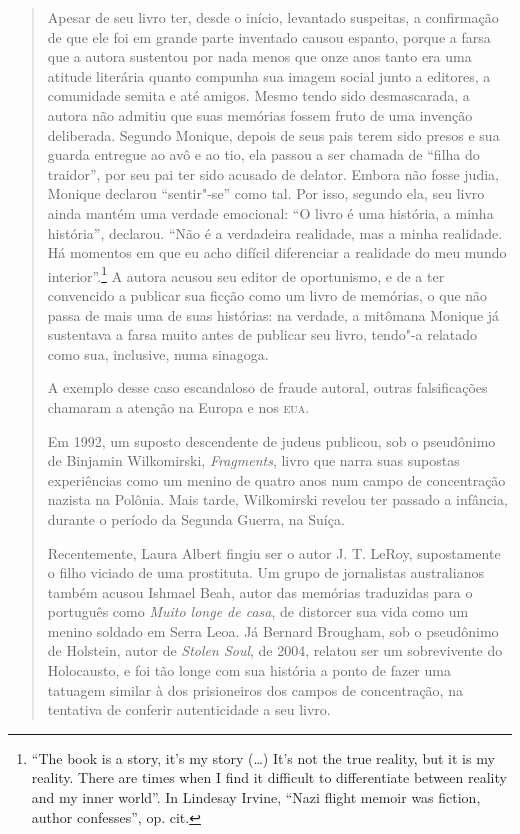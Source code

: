 \begin{quote}
Apesar de seu livro ter, desde o início, levantado suspeitas, a
confirmação de que ele foi em grande parte inventado causou espanto,
porque a farsa que a autora sustentou por nada menos que onze anos tanto
era uma atitude literária quanto compunha sua imagem social junto a
editores, a comunidade semita e até amigos. Mesmo tendo sido
desmascarada, a autora não admitiu que suas memórias fossem fruto de uma
invenção deliberada. Segundo Monique, depois de seus pais terem sido
presos e sua guarda entregue ao avô e ao tio, ela passou a ser chamada
de ``filha do traidor'', por seu pai ter sido acusado de delator. Embora
não fosse judia, Monique declarou ``sentir"-se'' como tal. Por isso,
segundo ela, seu livro ainda mantém uma verdade emocional: ``O livro é
uma história, a minha história'', declarou. ``Não é a verdadeira
realidade, mas a minha realidade. Há momentos em que eu acho difícil
diferenciar a realidade do meu mundo interior''.\footnote{``The book is
  a story, it's my story (\ldots{}) It's not the true reality, but it is my
  reality. There are times when I find it difficult to differentiate
  between reality and my inner world''. In Lindesay Irvine, ``Nazi
  flight memoir was fiction, author confesses'', op. cit.} A autora
acusou seu editor de oportunismo, e de a ter convencido a publicar sua
ficção como um livro de memórias, o que não passa de mais uma de suas
histórias: na verdade, a mitômana Monique já sustentava a farsa muito
antes de publicar seu livro, tendo"-a relatado como sua, inclusive, numa
sinagoga.

A exemplo desse caso escandaloso de fraude autoral, outras falsificações
chamaram a atenção na Europa e nos \textsc{eua}.

Em 1992, um suposto descendente de judeus publicou, sob o pseudônimo de
Binjamin Wilkomirski, \emph{Fragments}, livro que narra suas supostas
experiências como um menino de quatro anos num campo de concentração
nazista na Polônia. Mais tarde, Wilkomirski revelou ter passado a
infância, durante o período da Segunda Guerra, na Suíça.

Recentemente, Laura Albert fingiu ser o autor J. T. LeRoy, supostamente
o filho viciado de uma prostituta. Um grupo de jornalistas australianos
também acusou Ishmael Beah, autor das memórias traduzidas para o
português como \emph{Muito longe de casa}, de distorcer sua vida como um
menino soldado em Serra Leoa. Já Bernard Brougham, sob o pseudônimo de
Holstein, autor de \emph{Stolen Soul}, de 2004, relatou ser um
sobrevivente do Holocausto, e foi tão longe com sua história a ponto de
fazer uma tatuagem similar à dos prisioneiros dos campos de
concentração, na tentativa de conferir autenticidade a seu livro.


\end{quote}
